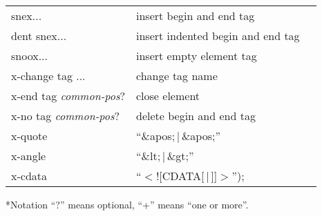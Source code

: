 \documentclass[twocolumn,10pt]{article}
\makeatletter
\renewcommand{\subsubsection}{\@startsection
  {subsection}{3}{0mm}{-.1\baselineskip}{-.1\baselineskip}%
  {\normalfont\bfseries}}
\newcommand{\vbar}{$\,|\,$}
\newcommand{\command}[1]{\textsf{\textup{#1}}}
\newcommand{\cat}[1]{\textrm{\textit{#1}}}
\newenvironment{mycenter}
{\begin{trivlist}\item \begin{footnotesize}}
{\end{footnotesize}\end{trivlist}}
\makeatother
\begin{document}
  \begin{mycenter}
    \begin{tabular}[t]{lll}
      \command{snex}... & insert begin and end tag\\
      \command{dent snex}... & insert indented begin and end tag\\
      \command{snoox}...& insert empty element tag\\
      \command{x-change tag} ... & change tag name\\
      \command{x-end tag} \cat{common-pos}? & close element\\
      \command{x-no tag} \cat{common-pos}? & delete begin
      and end tag\\
      \command{x-quote} & ``\&apos;\vbar\&apos;''\\
      \command{x-angle} & ``\&lt;\vbar\&gt;''\\
      \command{x-cdata} & ``$<$![CDATA[\vbar]]$>$'');\\
    \end{tabular}
  \end{mycenter}

  \subsubsection*{Notation}
  ``?'' means optional, ``+'' means ``one or more''.
\end{document}
